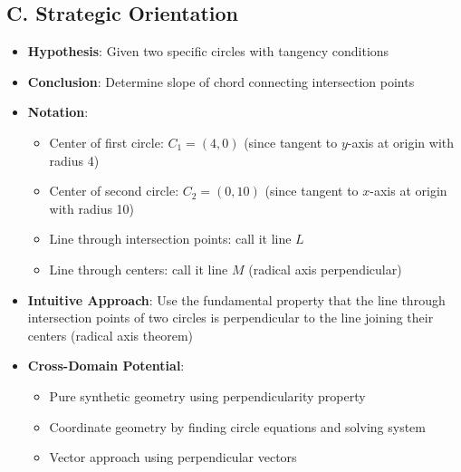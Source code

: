 \documentclass[12pt]{article}
\begin{document}
\begin{problemconfigbox}
\subsection*{C. Strategic Orientation}
\begin{itemize}[leftmargin=*]
    \item \textbf{Hypothesis}: Given two specific circles with tangency conditions
    \item \textbf{Conclusion}: Determine slope of chord connecting intersection points
    \item \textbf{Notation}: 
    \begin{itemize}
        \item Center of first circle: $C_1 = (4, 0)$ (since tangent to $y$-axis at origin with radius 4)
        \item Center of second circle: $C_2 = (0, 10)$ (since tangent to $x$-axis at origin with radius 10)
        \item Line through intersection points: call it line $L$
        \item Line through centers: call it line $M$ (radical axis perpendicular)
    \end{itemize}
    \item \textbf{Intuitive Approach}: Use the fundamental property that the line through intersection points of two circles is perpendicular to the line joining their centers (radical axis theorem)
    \item \textbf{Cross-Domain Potential}: 
    \begin{itemize}
        \item Pure synthetic geometry using perpendicularity property
        \item Coordinate geometry by finding circle equations and solving system
        \item Vector approach using perpendicular vectors
    \end{itemize}
\end{itemize}
\end{problemconfigbox}
\end{document}
